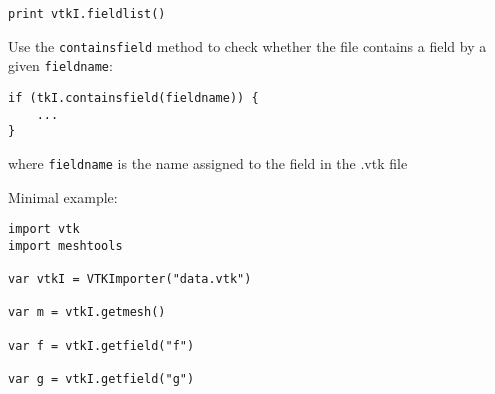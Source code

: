 \begin{lstlisting}
print vtkI.fieldlist()
\end{lstlisting}

Use the \texttt{containsfield} method to check whether the file contains
a field by a given \texttt{fieldname}:

\begin{lstlisting}
if (tkI.containsfield(fieldname)) {
    ... 
}
\end{lstlisting}

where \texttt{fieldname} is the name assigned to the field in the .vtk
file

Minimal example:

\begin{lstlisting}
import vtk
import meshtools 

var vtkI = VTKImporter("data.vtk")

var m = vtkI.getmesh()

var f = vtkI.getfield("f")

var g = vtkI.getfield("g")
\end{lstlisting}
